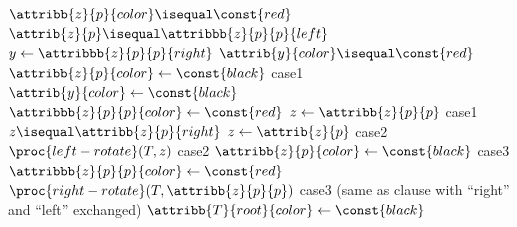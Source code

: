 \documentclass[UTF8,11pt,openany]{ctexbook}
\begin{document}
\begin{codebox}
	\li     \While $  \attribb{z}{p}{color} \isequal \const{red}$ 
	\li     \Do \If   $ \attrib{z}{p} \isequal \attribbb{z}{p}{p}{left} $ 
	\li         \Then $ y \gets \attribbb{z}{p}{p}{right}  $
	\li				\If   $ \attrib{y}{color} \isequal \const{red}  $ 
	\li             \Then $ \attribb{z}{p}{color} \gets \const{black}  $ \RComment case1
	\li                   $ \attrib{y}{color} \gets \const{black} $
	\li                   $ \attribbb{z}{p}{p}{color} \gets \const{red} $
	\li                   $ z \gets \attribb{z}{p}{p} $                  \RComment case1
	\li             \Else \If $z \isequal \attribb{z}{p}{right}$
	\li                   \Then $ z \gets \attrib{z}{p}  $				\RComment case2
	\li	                         $\proc{left-rotate}(T,z)$			    \RComment case2
						  \End
    \li                   $\attribb{z}{p}{color} \gets \const{black} $   \RComment case3
    \li                   $\attribbb{z}{p}{p}{color} \gets \const{red} $
 	\li	                  $\proc{right-rotate}(T,\attribb{z}{p}{p})$     \RComment case3
					\End   
	\li         \Else  (same as  clause 	with “right” and “left” exchanged)
				\End
			\End
	\li     $\attribb{T}{root}{color} \gets \const{black} $	
\end{codebox}



\newpage 
\end{document}
